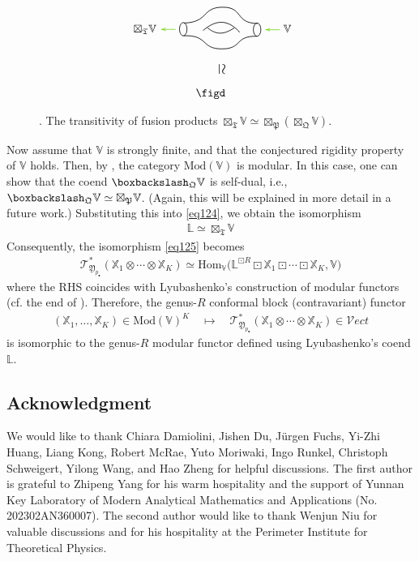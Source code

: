 \documentclass[11pt,b5paper,notitlepage]{article}
\theoremstyle{definition}
\theoremstyle{plain}
\newcommand{\fk}{\mathfrak}
\newcommand{\Hom}{\mathrm{Hom}}
\newcommand{\Vect}{\mathcal Vect}
\newcommand{\mbb}{\mathbb}
\newcommand{\blt}{\bullet}
\newcommand{\Vbb}{\mathbb V}
\newcommand{\Xbb}{\mathbb X}
\newcommand{\<}{\left\langle}
\renewcommand{\>}{\right\rangle}
\newcommand{\ST}{\mathscr{T}}
\newcommand{\bbs}{\boxbackslash}
\newcommand{\fq}{{\mathfrak Q}}
\newcommand{\Mod}{\mathrm{Mod}}
\newcommand{\fp}{\mathfrak{P}}
\newcommand{\fy}{\mathfrak{Y}}
\numberwithin{equation}{section}
\begin{document}
\begin{figure}[h]

	\centering
\begin{gather*}
\figc\\
\qquad\rotatebox{-90}{\scalebox{1.3}{$\simeq$}~~}\\
\figd
\end{gather*}


	\caption{. The transitivity of fusion products $\boxtimes_{\fk T}\Vbb\simeq\boxtimes_\fp(\boxtimes_\fq\Vbb)$.}
	\label{fig5}
\end{figure} 



Now assume that $\Vbb$ is strongly finite, and that the conjectured rigidity property of $\Vbb$ holds. Then, by \cite{McR21-rational}, the category $\Mod(\Vbb)$ is modular. In this case, one can show that the coend $\bbs_\fq\Vbb$ is self-dual, i.e., $\bbs_\fq\Vbb\simeq\boxtimes_\fp\Vbb$. (Again, this will be explained in more detail in a future work.) Substituting this into \eqref{eq124}, we obtain the isomorphism
\begin{align*}
\mbb L\simeq\boxtimes_{\fk T}\Vbb
\end{align*}
Consequently, the isomorphism \eqref{eq125} becomes
\begin{align}
\ST^*_{\fy_{p_\blt}}(\Xbb_1\otimes\cdots\otimes\Xbb_K)\simeq\Hom_\Vbb\big(\mbb L^{\boxdot R}\boxdot\Xbb_1\boxdot\cdots\boxdot\Xbb_K,\Vbb\big)
\end{align}
where the RHS coincides with Lyubashenko's construction of modular functors (cf. the end of \cite[Sec. 8.2]{Lyu96-Ribbon}). Therefore, the genus-$R$ conformal block (contravariant) functor
\begin{align*}
(\Xbb_1,\dots,\Xbb_K)\in\Mod(\Vbb)^{K}\quad\mapsto\quad\ST^*_{\fy_{p_\blt}}(\Xbb_1\otimes\cdots\otimes\Xbb_K)\in\Vect
\end{align*}
is isomorphic to the genus-$R$ modular functor defined using Lyubashenko's coend $\mbb L$.





\subsection*{Acknowledgment}



We would like to thank Chiara Damiolini, Jishen Du, J\"urgen Fuchs, Yi-Zhi Huang, Liang Kong, Robert McRae, Yuto Moriwaki, Ingo Runkel, Christoph Schweigert, Yilong Wang, and Hao Zheng for helpful discussions. The first author is grateful to Zhipeng Yang for his warm hospitality and the support of Yunnan Key Laboratory of Modern Analytical Mathematics and Applications (No. 202302AN360007). The second author would like to thank Wenjun Niu for valuable discussions and for his hospitality at the Perimeter Institute for Theoretical Physics.
\end{document}

